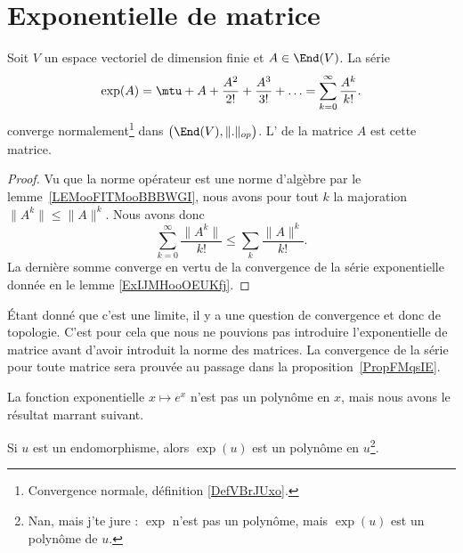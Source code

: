\section{Exponentielle de matrice}
\label{secAOnIwQM}

\begin{proposition}     \label{PropPEDSooAvSXmY}
	Soit \( V\) un espace vectoriel de dimension finie et \( A\in\End(V)\). La série
	\begin{equation}
		\exp(A)=\mtu+A+\frac{ A^2 }{ 2! }+\frac{ A^3 }{ 3! }+\ldots =\sum_{k=0}^{\infty}\frac{ A^k }{ k! }.
	\end{equation}
	converge normalement\footnote{Convergence normale, définition \ref{DefVBrJUxo}.} dans \( \big( \End(V),\| . \|_{op} \big)\).  L' de la matrice \( A\) est cette matrice.
\end{proposition}

\begin{proof}
	Vu que la norme opérateur est une norme d'algèbre par le lemme~\ref{LEMooFITMooBBBWGI}, nous avons pour tout \( k\) la majoration \( \| A^k \|\leq \| A \|^k\). Nous avons donc
	\begin{equation}
		\sum_{k=0}^{\infty}\frac{ \| A^k \| }{ k! }\leq \sum_k\frac{ \| A \|^k }{ k! }.
	\end{equation}
	La dernière somme converge en vertu de la convergence de la série exponentielle donnée en le lemme \ref{ExIJMHooOEUKfj}.
\end{proof}

Étant donné que c'est une limite, il y a une question de convergence et donc de topologie. C'est pour cela que nous ne pouvions pas introduire l'exponentielle de matrice avant d'avoir introduit la norme des matrices. La convergence de la série pour toute matrice sera prouvée au passage dans la proposition~\ref{PropFMqsIE}.


La fonction exponentielle \(  x\mapsto e^{x}\) n'est pas un polynôme en \( x\), mais nous avons le résultat marrant suivant.
\begin{proposition} \label{PropFMqsIE}
	Si \( u\) est un endomorphisme, alors \( \exp(u)\) est un polynôme en \( u\)\footnote{Nan, mais j'te jure : \( \exp\) n'est pas un polynôme, mais \( \exp(u)\) est un polynôme de \( u\).}.
\end{proposition}

